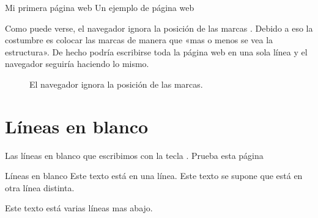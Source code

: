 \documentclass[a4paper,12pt,spanish]{sphinxmanual}
\begin{document}
%
\begin{sphinxVerbatim}[commandchars=\\\{\}]
     Mi primera página web
     Un ejemplo de página web   
\end{sphinxVerbatim}

Como puede verse, el navegador ignora la posición de las marcas . Debido a eso la costumbre es colocar las marcas de manera que «mas o menos se vea la estructura». De hecho podría escribirse toda la página web en una sola línea y el navegador seguiría haciendo lo mismo.

\begin{figure}[htbp]
\centering
\capstart

\noindent{}
\caption{El navegador ignora la posición de las marcas.}\label{\detokenize{index:id8}}\end{figure}


\section{Líneas en blanco}
\label{\detokenize{index:lineas-en-blanco}}
Las líneas en blanco que escribimos con la tecla  . Prueba esta página

%
\begin{sphinxVerbatim}[commandchars=\\\{\}]
         Líneas en blanco
     Este texto está en una línea.
     Este texto se supone que está en otra línea distinta.


     Este texto está varias líneas mas abajo.
\end{sphinxVerbatim}
\end{document}
